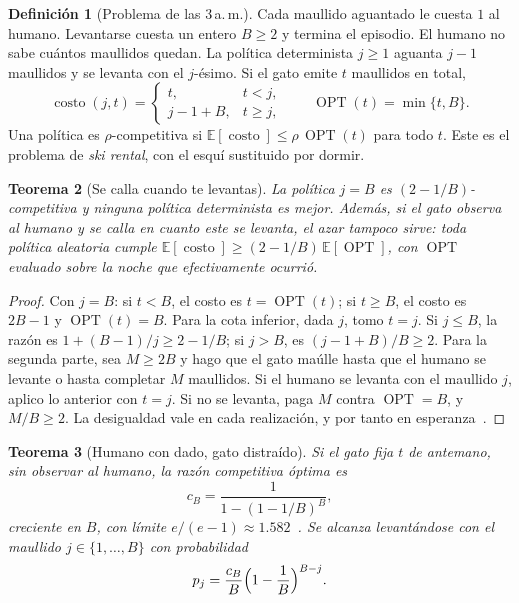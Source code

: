 \documentclass[11pt,a4paper]{article}
\theoremstyle{plain}
\newtheorem{teorema}{Teorema}[section]
\theoremstyle{definition}
\newtheorem{definicion}[teorema]{Definición}
\theoremstyle{remark}
\numberwithin{equation}{section}
\newcommand{\E}{\mathbb{E}}
\newcommand{\costo}{\operatorname{costo}}
\newcommand{\OPT}{\operatorname{OPT}}
\begin{document}
\begin{definicion}[Problema de las 3\,a.\,m.]
Cada maullido aguantado le cuesta $1$ al humano. Levantarse cuesta un entero $B\ge 2$ y termina el episodio. El humano no sabe cuántos maullidos quedan. La política determinista $j\ge 1$ aguanta $j-1$ maullidos y se levanta con el $j$-ésimo. Si el gato emite $t$ maullidos en total,
\begin{equation}
  \costo(j,t)=\begin{cases}t, & t<j,\\ j-1+B, & t\ge j,\end{cases}
  \qquad
  \OPT(t)=\min\{t,B\}.
\end{equation}
Una política es $\rho$-competitiva si $\E[\costo]\le\rho\,\OPT(t)$ para todo $t$. Este es el problema de \emph{ski rental}, con el esquí sustituido por dormir.
\end{definicion}

\begin{teorema}[Se calla cuando te levantas]\label{teo:adaptativo}
La política $j=B$ es $(2-1/B)$-competitiva y ninguna política determinista es mejor. Además, si el gato observa al humano y se calla en cuanto este se levanta, el azar tampoco sirve: toda política aleatoria cumple $\E[\costo]\ge(2-1/B)\,\E[\OPT]$, con $\OPT$ evaluado sobre la noche que efectivamente ocurrió.
\end{teorema}

\begin{proof}
Con $j=B$: si $t<B$, el costo es $t=\OPT(t)$; si $t\ge B$, el costo es $2B-1$ y $\OPT(t)=B$. Para la cota inferior, dada $j$, tomo $t=j$. Si $j\le B$, la razón es $1+(B-1)/j\ge 2-1/B$; si $j>B$, es $(j-1+B)/B\ge 2$. Para la segunda parte, sea $M\ge 2B$ y hago que el gato maúlle hasta que el humano se levante o hasta completar $M$ maullidos. Si el humano se levanta con el maullido $j$, aplico lo anterior con $t=j$. Si no se levanta, paga $M$ contra $\OPT=B$, y $M/B\ge 2$. La desigualdad vale en cada realización, y por tanto en esperanza~\cite{bendavid}.
\end{proof}

\begin{teorema}[Humano con dado, gato distraído]\label{teo:dado}
Si el gato fija $t$ de antemano, sin observar al humano, la razón competitiva óptima es
\begin{equation}
  c_B=\frac{1}{1-(1-1/B)^B},
\end{equation}
creciente en $B$, con límite $e/(e-1)\approx 1.582$~\cite{karlin}. Se alcanza levantándose con el maullido $j\in\{1,\dots,B\}$ con probabilidad
\begin{equation}
  p_j=\frac{c_B}{B}\Bigl(1-\frac1B\Bigr)^{B-j}.
\end{equation}
\end{teorema}
\end{document}

